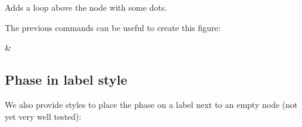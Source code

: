 \documentclass[a4paper]{ltxdoc}
\begin{document}
{\begin{command}{\zxLoopAboveDots{}}
  Adds a loop above the node with some dots.
\begin{codeexample}[width=3cm]
\begin{ZX}
  \zxX{\alpha} \zxLoopAboveDots{}
\end{ZX}
\end{codeexample}
\end{command}

\noindent The previous commands can be useful to create this figure:
\begin{codeexample}[width=0pt]%
\begin{ZX}
   \zxX{\alpha} \zxLoopAboveDots{} \middleManyDots{} \ar[r,o'={a=75}]
      & \zxX{\beta} \zxLoopAboveDots{} 
\end{ZX}
\end{codeexample}

\subsection{Phase in label style}

We also provide styles to place the phase on a label next to an empty node (not yet very well tested):

}
\end{document}
